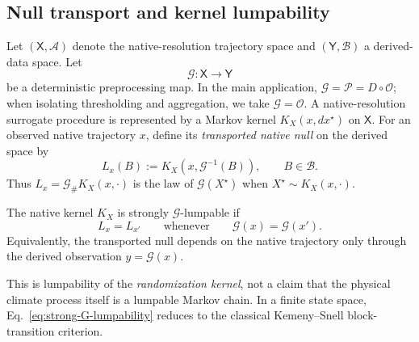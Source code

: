 
\subsection{Null transport and kernel lumpability}\label{null-transport-lumpability}

Let $(\mathsf X,\mathcal A)$ denote the native-resolution trajectory space and
$(\mathsf Y,\mathcal B)$ a derived-data space.  Let
\[
\mathcal G:\mathsf X\to\mathsf Y
\]
be a deterministic preprocessing map.  In the main application,
$\mathcal G=\mathcal P=D\circ\mathcal O$; when isolating thresholding and
aggregation, we take $\mathcal G=\mathcal O$.  A native-resolution surrogate
procedure is represented by a Markov kernel $K_X(x,dx^\star)$ on $\mathsf X$.
For an observed native trajectory $x$, define its \emph{transported native
null} on the derived space by
\begin{equation}
L_x(B)
:=K_X\!\left(x,\mathcal G^{-1}(B)\right),
\qquad B\in\mathcal B.
\label{eq:transported-native-null}
\end{equation}
Thus $L_x=\mathcal G_\#K_X(x,\cdot)$ is the law of
$\mathcal G(X^\star)$ when $X^\star\sim K_X(x,\cdot)$.

\begin{definition}
The native kernel $K_X$ is strongly $\mathcal G$-lumpable if
\begin{equation}
L_x=L_{x'}
\qquad\text{whenever}\qquad
\mathcal G(x)=\mathcal G(x').
\label{eq:strong-G-lumpability}
\end{equation}
Equivalently, the transported null depends on the native trajectory only
through the derived observation $y=\mathcal G(x)$.
\end{definition}

This is lumpability of the \emph{randomization kernel}, not a claim that the
physical climate process itself is a lumpable Markov chain.  In a finite
state space, Eq.~\eqref{eq:strong-G-lumpability} reduces to the classical
Kemeny--Snell block-transition criterion.

